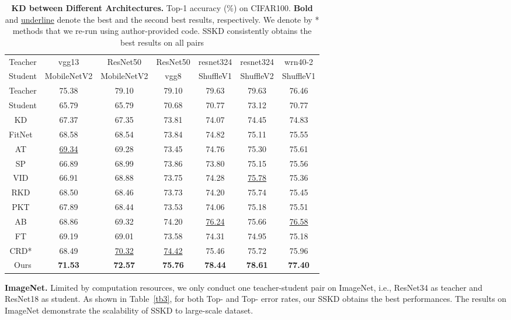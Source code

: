 \documentclass[runningheads]{llncs}
\begin{document}
\begin{table*}[t]
	\centering
	\caption{\textbf{KD between Different Architectures.} Top-1 accuracy (\%) on CIFAR100. \textbf{Bold} and \underline{underline} denote the best and the second best results, respectively. We denote by * methods that we re-run using author-provided code. SSKD consistently obtains the best results on all pairs}
	\vspace{-5pt}
	\begin{tabular}{ccccccc}
		\toprule
		Teacher & vgg13 & ResNet50 & ResNet50 & resnet324 & resnet324 & wrn40-2 \\
		Student & MobileNetV2 & MobileNetV2 & vgg8 & ShuffleV1 & ShuffleV2 & ShuffleV1 \\
		\midrule
		Teacher & 75.38 & 79.10 & 79.10 & 79.63 & 79.63 & 76.46 \\
        Student & 65.79 & 65.79 & 70.68 & 70.77 & 73.12 & 70.77 \\
		\midrule
		KD~\cite{KD} & 67.37 & 67.35 & 73.81 & 74.07 & 74.45 & 74.83 \\
        FitNet~\cite{fitnets} & 68.58 & 68.54 & 73.84 & 74.82 & 75.11 & 75.55 \\
        AT~\cite{AT} & \underline{69.34} & 69.28 & 73.45 & 74.76 & 75.30 & 75.61 \\
        SP~\cite{simi} & 66.89 & 68.99 & 73.86 & 73.80 & 75.15 & 75.56 \\
        VID~\cite{vid} & 66.91 & 68.88 & 73.75 & 74.28 & \underline{75.78} & 75.36 \\
        RKD~\cite{rkd} & 68.50 & 68.46 & 73.73 & 74.20 & 75.74 & 75.45 \\
        PKT~\cite{pkt} & 67.89 & 68.44 & 73.53 & 74.06 & 75.18 & 75.51 \\
        AB~\cite{AB} & 68.86 & 69.32 & 74.20 & \underline{76.24} & 75.66 & \underline{76.58} \\
        FT~\cite{FT} & 69.19 & 69.01 & 73.58 & 74.31 & 74.95 & 75.18 \\
        CRD*~\cite{crd} & 68.49 & \underline{70.32} & \underline{74.42} & 75.46 & 75.72 & 75.96 \\
        \midrule
        Ours & \textbf{71.53} & \textbf{72.57} & \textbf{75.76} & \textbf{78.44} & \textbf{78.61} & \textbf{77.40} \\
		\bottomrule
	\end{tabular}
	\label{tb2}
\end{table*}

\noindent
\textbf{ImageNet.}
Limited by computation resources, we only conduct one teacher-student pair on ImageNet, i.e., ResNet34 as teacher and ResNet18 as student.
As shown in Table~\ref{tb3}, for both Top- and Top- error rates, our SSKD obtains the best performances. The results on ImageNet demonstrate the scalability of SSKD to large-scale dataset.
\end{document}
